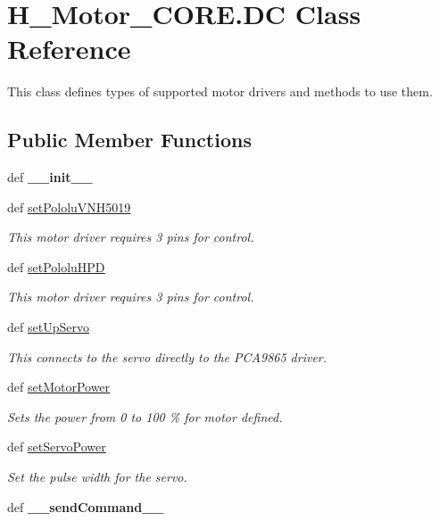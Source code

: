 \hypertarget{classH__Motor__CORE_1_1DC}{}\section{H\+\_\+\+Motor\+\_\+\+C\+O\+R\+E.\+D\+C Class Reference}
\label{classH__Motor__CORE_1_1DC}


This class defines types of supported motor drivers and methods to use them.  


\subsection*{Public Member Functions}
\begin{DoxyCompactItemize}
\item 
\hypertarget{classH__Motor__CORE_1_1DC_a04d237d3d2a38ca8add958048a37523e}{}def {\bfseries \+\_\+\+\_\+init\+\_\+\+\_\+}\label{classH__Motor__CORE_1_1DC_a04d237d3d2a38ca8add958048a37523e}

\item 
def \hyperlink{classH__Motor__CORE_1_1DC_acd439ffea6f20a26da0f225dba5bdd85}{set\+Pololu\+V\+N\+H5019}
\begin{DoxyCompactList}\small\item\em This motor driver requires 3 pins for control. \end{DoxyCompactList}\item 
def \hyperlink{classH__Motor__CORE_1_1DC_a38e3d04b91ee44f3530727543be157d0}{set\+Pololu\+H\+P\+D}
\begin{DoxyCompactList}\small\item\em This motor driver requires 3 pins for control. \end{DoxyCompactList}\item 
def \hyperlink{classH__Motor__CORE_1_1DC_adaee491549e4965a5a1e8faa74b4ee71}{set\+Up\+Servo}
\begin{DoxyCompactList}\small\item\em This connects to the servo directly to the P\+C\+A9865 driver. \end{DoxyCompactList}\item 
def \hyperlink{classH__Motor__CORE_1_1DC_ad2cb6c12f26d6808deb4950afde67ddc}{set\+Motor\+Power}
\begin{DoxyCompactList}\small\item\em Sets the power from 0 to 100 \% for motor defined. \end{DoxyCompactList}\item 
def \hyperlink{classH__Motor__CORE_1_1DC_a19a817bfef9199ea2d5381795d055764}{set\+Servo\+Power}
\begin{DoxyCompactList}\small\item\em Set the pulse width for the servo. \end{DoxyCompactList}\item 
\hypertarget{classH__Motor__CORE_1_1DC_a370617fd03b40cc02ece7eef897cf962}{}def {\bfseries \+\_\+\+\_\+send\+Command\+\_\+\+\_\+}\label{classH__Motor__CORE_1_1DC_a370617fd03b40cc02ece7eef897cf962}

\end{DoxyCompactItemize}
